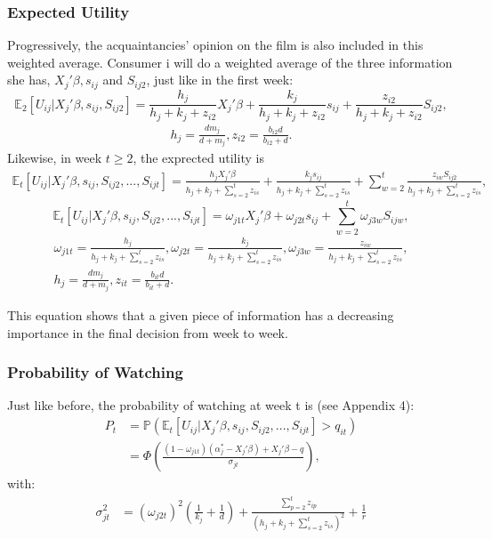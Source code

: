 	\subsubsection{Expected Utility}
	Progressively, the acquaintancies' opinion on the film is also included in this weighted average.
	Consumer i will do a weighted average of the three information she has, $X_{j}'\beta, s_{i j}$ and $S_{i j 2}$, just like in the first week:
	\begin{equation}
	\mathbb{E}_2[U_{i j}|X_{j}'\beta, s_{i j}, S_{i j 2}]=\frac{h_{j}}{h_{j}+k_{j}+z_{i 2}} X_{j}'\beta+\frac{k_{j}}{h_{j}+k_{j}+z_{i 2}}s_{i j}+\frac{z_{i 2}}{h_{j}+k_{j}+z_{i 2}}S_{i j 2}, 
	\end{equation}
	\begin{align*}
	h_{j}=\frac{d m_{j}}{d+m_{j}}, z_{i 2}=\frac{b_{i 2}d}{b_{i 2}+d}.
	\end{align*}
	Likewise, in week $t\geqslant2$, the exprected utility is
	\begin{align*}
	\mathbb{E}_t[U_{i j}|X_{j}'\beta, s_{i j}, S_{i j 2}, ..., S_{i j t}]=\frac{h_{j}X_{j}'\beta}{h_{j}+k_{j}+\sum_{s=2}^{t}z_{i s}} +\frac{k_{j}s_{i j}}{h_{j}+k_{j}+\sum_{s=2}^{t}z_{i s}}+\sum_{w=2}^{t}\frac{z_{i w}S_{i j 2}}{h_{j}+k_{j}+\sum_{s=2}^{t}z_{i s}}, 
	\end{align*}
	\begin{equation}
	\mathbb{E}_t[U_{i j}|X_{j}'\beta, s_{i j}, S_{i j 2}, ..., S_{i j t}]=\omega_{j 1 t}X_{j}'\beta +\omega_{j 2 t}s_{i j}+\sum_{w=2}^{t}\omega_{j 3 w}S_{i j w}, 
	\end{equation}
	\begin{align*}
	\omega_{j 1 t}=\frac{h_{j}}{h_{j}+k_{j}+\sum_{s=2}^{t}z_{i s}}, 
	\omega_{j 2 t}=\frac{k_{j}}{h_{j}+k_{j}+\sum_{s=2}^{t}z_{i s}}, 
	\omega_{j 3 w}=\frac{z_{i w}}{h_{j}+k_{j}+\sum_{s=2}^{t}z_{i s}},\\
	h_{j}=\frac{d m_{j}}{d+m_{j}}, z_{i t}=\frac{b_{i t}d}{b_{i t}+d}.
	\end{align*}
	
	This equation shows that a given piece of information has a decreasing importance in the final decision from week to week.
	
	\subsubsection{Probability of Watching}
	Just like before, the probability of watching at week t is (see Appendix 4):
	\begin{align*}
	P_{t}&=\mathbb{P}(\mathbb{E}_t[U_{i j}|X_{j}'\beta, s_{i j}, S_{i j 2}, ..., S_{i j t}]>q_{i t})\\
	&=\Phi\left(\frac{(1-\omega_{j 1 t})(\alpha_{j}^{*}-X_{j}'\beta)+X_{j}'\beta-q}{\sigma_{j t}}\right),
	\end{align*}
	with:
	\begin{align*}
	\sigma_{j t}^{2}
	&=(\omega_{j 2 t })^{2}\left(\frac{1}{k_{j}}+\frac{1}{d}\right)+\frac{\sum_{p=2}^{t}z_{i p}}{(h_{j}+k_{j}+\sum_{s=2}^{t}z_{i s})^{2}}+\frac{1}{r}
	\end{align*}
	
